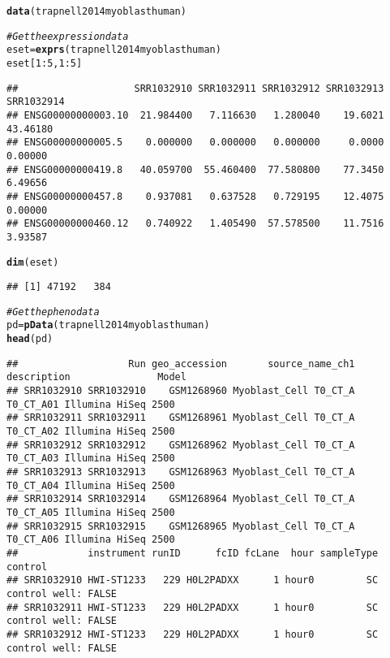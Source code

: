 \documentclass{article}\usepackage[]{graphicx}\usepackage[usenames,dvipsnames]{color}
\makeatletter
\newcommand{\hlnum}[1]{\textcolor[rgb]{0.686,0.059,0.569}{#1}}%
\newcommand{\hlcom}[1]{\textcolor[rgb]{0.678,0.584,0.686}{\textit{#1}}}%
\newcommand{\hlopt}[1]{\textcolor[rgb]{0,0,0}{#1}}%
\newcommand{\hlstd}[1]{\textcolor[rgb]{0.345,0.345,0.345}{#1}}%
\newcommand{\hlkwb}[1]{\textcolor[rgb]{0.69,0.353,0.396}{#1}}%
\newcommand{\hlkwd}[1]{\textcolor[rgb]{0.737,0.353,0.396}{\textbf{#1}}}%
\newenvironment{kframe}{%
 \def\at@end@of@kframe{}%
 \ifinner\ifhmode%
  \def\at@end@of@kframe{\end{minipage}}%
  \begin{minipage}{\columnwidth}%
 \fi\fi%
 \def\FrameCommand##1{\hskip\@totalleftmargin \hskip-\fboxsep
 \colorbox{shadecolor}{##1}\hskip-\fboxsep
     \hskip-\linewidth \hskip-\@totalleftmargin \hskip\columnwidth}%
 \MakeFramed {\advance\hsize-\width
   \@totalleftmargin\z@ \linewidth\hsize
   \@setminipage}}%
 {\par\unskip\endMakeFramed%
 \at@end@of@kframe}
\newenvironment{knitrout}{}{} %
\makeatother
\begin{document}
\begin{knitrout}
\color{fgcolor}\begin{kframe}
\begin{alltt}
\hlkwd{data}\hlstd{(trapnell2014myoblasthuman)}

\hlcom{# Get the expression data}
\hlstd{eset} \hlkwb{=} \hlkwd{exprs}\hlstd{(trapnell2014myoblasthuman)}
\hlstd{eset[}\hlnum{1}\hlopt{:}\hlnum{5}\hlstd{,} \hlnum{1}\hlopt{:}\hlnum{5}\hlstd{]}
\end{alltt}
\begin{verbatim}
##                    SRR1032910 SRR1032911 SRR1032912 SRR1032913 SRR1032914
## ENSG00000000003.10  21.984400   7.116630   1.280040    19.6021   43.46180
## ENSG00000000005.5    0.000000   0.000000   0.000000     0.0000    0.00000
## ENSG00000000419.8   40.059700  55.460400  77.580800    77.3450    6.49656
## ENSG00000000457.8    0.937081   0.637528   0.729195    12.4075    0.00000
## ENSG00000000460.12   0.740922   1.405490  57.578500    11.7516    3.93587
\end{verbatim}
\begin{alltt}
\hlkwd{dim}\hlstd{(eset)}
\end{alltt}
\begin{verbatim}
## [1] 47192   384
\end{verbatim}
\begin{alltt}
\hlcom{# Get the pheno data}
\hlstd{pd} \hlkwb{=} \hlkwd{pData}\hlstd{(trapnell2014myoblasthuman)}
\hlkwd{head}\hlstd{(pd)}
\end{alltt}
\begin{verbatim}
##                   Run geo_accession       source_name_ch1 description               Model
## SRR1032910 SRR1032910    GSM1268960 Myoblast_Cell T0_CT_A   T0_CT_A01 Illumina HiSeq 2500
## SRR1032911 SRR1032911    GSM1268961 Myoblast_Cell T0_CT_A   T0_CT_A02 Illumina HiSeq 2500
## SRR1032912 SRR1032912    GSM1268962 Myoblast_Cell T0_CT_A   T0_CT_A03 Illumina HiSeq 2500
## SRR1032913 SRR1032913    GSM1268963 Myoblast_Cell T0_CT_A   T0_CT_A04 Illumina HiSeq 2500
## SRR1032914 SRR1032914    GSM1268964 Myoblast_Cell T0_CT_A   T0_CT_A05 Illumina HiSeq 2500
## SRR1032915 SRR1032915    GSM1268965 Myoblast_Cell T0_CT_A   T0_CT_A06 Illumina HiSeq 2500
##            instrument runID      fcID fcLane  hour sampleType             control
## SRR1032910 HWI-ST1233   229 H0L2PADXX      1 hour0         SC control well: FALSE
## SRR1032911 HWI-ST1233   229 H0L2PADXX      1 hour0         SC control well: FALSE
## SRR1032912 HWI-ST1233   229 H0L2PADXX      1 hour0         SC control well: FALSE

\end{verbatim}
\end{kframe}
\end{knitrout}
\end{document}
